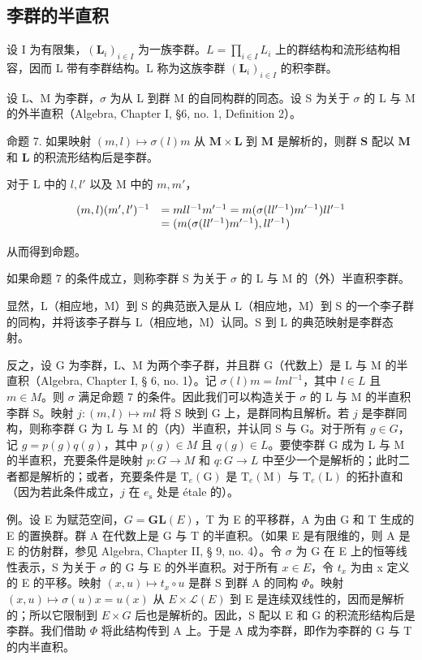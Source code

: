 \subsection{李群的半直积}

设 I 为有限集，\((\mathbf{L}_{i})_{i\in I}\) 为一族李群。\(L=\prod_{i\in I}L_{i}\) 上的群结构和流形结构相容，因而 L 带有李群结构。L 称为这族李群 \((\mathbf{L}_{i})_{i\in I}\) 的积李群。

设 L、M 为李群，\(\sigma\) 为从 L 到群 M 的自同构群的同态。设 S 为关于 \(\sigma\) 的 L 与 M 的外半直积（Algebra, Chapter I, §6, no. 1, Definition 2）。

命题 7. 如果映射 \((m, l) \mapsto \sigma(l)m\) 从 \(\mathbf{M} \times \mathbf{L}\) 到 \(\mathbf{M}\) 是解析的，则群 \(\mathbf{S}\) 配以 \(\mathbf{M}\) 和 \(\mathbf{L}\) 的积流形结构后是李群。

对于 L 中的 \(l, l'\) 以及 M 中的 \(m, m'\)，

\[
\begin{array}{r l} (m, l) (m ^ {\prime}, l ^ {\prime}) ^ {- 1} & = m l l ^ {- 1} m ^ {\prime - 1} = m (\sigma (l l ^ {\prime - 1}) m ^ {\prime - 1}) l l ^ {\prime - 1} \\ & = (m (\sigma (l l ^ {\prime - 1}) m ^ {\prime - 1}), l l ^ {\prime - 1}) \end{array}
\]

从而得到命题。

如果命题 7 的条件成立，则称李群 S 为关于 \(\sigma\) 的 L 与 M 的（外）半直积李群。

显然，L（相应地，M）到 S 的典范嵌入是从 L（相应地，M）到 S 的一个李子群的同构，并将该李子群与 L（相应地，M）认同。S 到 L 的典范映射是李群态射。

反之，设 G 为李群，L、M 为两个李子群，并且群 G（代数上）是 L 与 M 的半直积（Algebra, Chapter I, § 6, no. 1）。记 \(\sigma(l)m = lml^{-1}\)，其中 \(l \in L\) 且 \(m \in M\)。则 \(\sigma\) 满足命题 7 的条件。因此我们可以构造关于 \(\sigma\) 的 L 与 M 的半直积李群 S。映射 \(j: (m, l) \mapsto ml\) 将 S 映到 G 上，是群同构且解析。若 \(j\) 是李群同构，则称李群 G 为 L 与 M 的（内）半直积，并认同 S 与 G。对于所有 \(g \in G\)，记 \(g = p(g)q(g)\)，其中 \(p(g) \in M\) 且 \(q(g) \in L\)。要使李群 G 成为 L 与 M 的半直积，充要条件是映射 \(p: G \to M\) 和 \(q: G \to L\) 中至少一个是解析的；此时二者都是解析的；或者，充要条件是 \(\mathrm{T}_{e}(\mathrm{G})\) 是 \(\mathrm{T}_{e}(\mathrm{M})\) 与 \(\mathrm{T}_{e}(\mathrm{L})\) 的拓扑直和（因为若此条件成立，\(j\) 在 \(e_{\mathrm{s}}\) 处是 étale 的）。

例。设 E 为赋范空间，\(G = \mathbf{GL}(E)\)，T 为 E 的平移群，A 为由 G 和 T 生成的 E 的置换群。群 A 在代数上是 G 与 T 的半直积。（如果 E 是有限维的，则 A 是 E 的仿射群，参见 Algebra, Chapter II, § 9, no. 4）。令 \(\sigma\) 为 G 在 E 上的恒等线性表示，S 为关于 \(\sigma\) 的 G 与 E 的外半直积。对于所有 \(x \in E\)，令 \(t_{x}\) 为由 x 定义的 E 的平移。映射 \((x, u) \mapsto t_{x} \circ u\) 是群 S 到群 A 的同构 \(\Phi\)。映射 \((x, u) \mapsto \sigma(u)x = u(x)\) 从 \(E \times \mathcal{L}(E)\) 到 E 是连续双线性的，因而是解析的；所以它限制到 \(E \times G\) 后也是解析的。因此，S 配以 E 和 G 的积流形结构后是李群。我们借助 \(\Phi\) 将此结构传到 A 上。于是 A 成为李群，即作为李群的 G 与 T 的内半直积。

